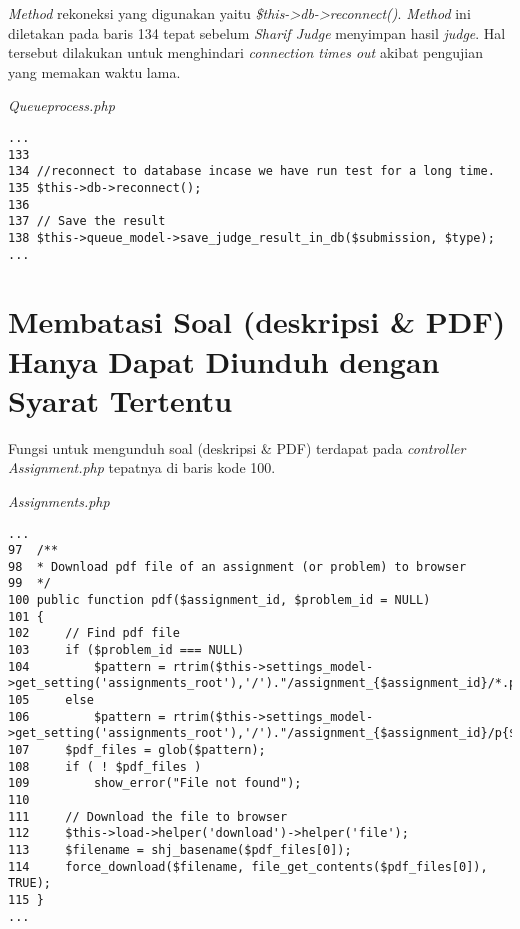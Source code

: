 \textit{Method} rekoneksi yang digunakan yaitu \textit{\$this->db->reconnect()}. \textit{Method} ini diletakan pada baris 134 tepat sebelum \textit{Sharif Judge} menyimpan hasil \textit{judge}. Hal tersebut dilakukan untuk menghindari \textit{connection times out} akibat pengujian yang memakan waktu lama.

\textit{Queueprocess.php}
\begin{lstlisting}[basicstyle=\ttfamily, frame=single,
columns=fullflexible, keepspaces=true]
...
133
134	//reconnect to database incase we have run test for a long time.
135	$this->db->reconnect();
136
137	// Save the result
138	$this->queue_model->save_judge_result_in_db($submission, $type);
...
\end{lstlisting}

\section{Membatasi Soal (deskripsi \& PDF) Hanya Dapat Diunduh dengan Syarat Tertentu}%
Fungsi untuk mengunduh soal (deskripsi \& PDF) terdapat pada \textit{controller Assignment.php} tepatnya di baris kode 100.

\textit{Assignments.php}
\begin{lstlisting}[basicstyle=\ttfamily, frame=single,
columns=fullflexible, keepspaces=true, breaklines=true]
...
97	/**
98	* Download pdf file of an assignment (or problem) to browser
99	*/
100	public function pdf($assignment_id, $problem_id = NULL)
101	{
102		// Find pdf file
103		if ($problem_id === NULL)
104			$pattern = rtrim($this->settings_model->get_setting('assignments_root'),'/')."/assignment_{$assignment_id}/*.pdf";
105		else
106			$pattern = rtrim($this->settings_model->get_setting('assignments_root'),'/')."/assignment_{$assignment_id}/p{$problem_id}/*.pdf";
107		$pdf_files = glob($pattern);
108		if ( ! $pdf_files )
109			show_error("File not found");
110
111		// Download the file to browser
112		$this->load->helper('download')->helper('file');
113		$filename = shj_basename($pdf_files[0]);
114		force_download($filename, file_get_contents($pdf_files[0]), TRUE);
115	}
...
\end{lstlisting}

